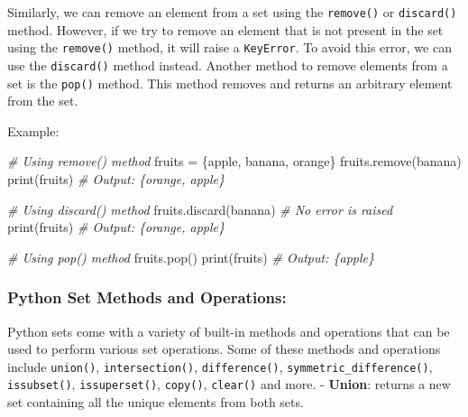 \documentclass[11pt]{article}
\newenvironment{Shaded}{}{}
\newcommand{\StringTok}[1]{\textcolor[rgb]{0.25,0.44,0.63}{{#1}}}
\newcommand{\CommentTok}[1]{\textcolor[rgb]{0.38,0.63,0.69}{\textit{{#1}}}}
\newcommand{\NormalTok}[1]{{#1}}
\newcommand{\OperatorTok}[1]{\textcolor[rgb]{0.40,0.40,0.40}{{#1}}}
\newcommand{\BuiltInTok}[1]{{#1}}
\begin{document}
Similarly, we can remove an element from a set using the
\texttt{remove()} or \texttt{discard()} method. However, if we try to
remove an element that is not present in the set using the
\texttt{remove()} method, it will raise a \texttt{KeyError}. To avoid
this error, we can use the \texttt{discard()} method instead. Another
method to remove elements from a set is the \texttt{pop()} method. This
method removes and returns an arbitrary element from the set.

Example:

\begin{Shaded}
\begin{Highlighting}[]
\CommentTok{\# Using remove() method}
\NormalTok{fruits }\OperatorTok{=}\NormalTok{ \{}\StringTok{\textquotesingle{}apple\textquotesingle{}}\NormalTok{, }\StringTok{\textquotesingle{}banana\textquotesingle{}}\NormalTok{, }\StringTok{\textquotesingle{}orange\textquotesingle{}}\NormalTok{\}}
\NormalTok{fruits.remove(}\StringTok{\textquotesingle{}banana\textquotesingle{}}\NormalTok{)}
\BuiltInTok{print}\NormalTok{(fruits) }\CommentTok{\# Output: \{\textquotesingle{}orange\textquotesingle{}, \textquotesingle{}apple\textquotesingle{}\}}

\CommentTok{\# Using discard() method}
\NormalTok{fruits.discard(}\StringTok{\textquotesingle{}banana\textquotesingle{}}\NormalTok{) }\CommentTok{\# No error is raised}
\BuiltInTok{print}\NormalTok{(fruits) }\CommentTok{\# Output: \{\textquotesingle{}orange\textquotesingle{}, \textquotesingle{}apple\textquotesingle{}\}}

\CommentTok{\# Using pop() method}
\NormalTok{fruits.pop()}
\BuiltInTok{print}\NormalTok{(fruits) }\CommentTok{\# Output: \{\textquotesingle{}apple\textquotesingle{}\}}
\end{Highlighting}
\end{Shaded}

\hypertarget{python-set-methods-and-operations}{%
\subsubsection{Python Set Methods and
Operations:}\label{python-set-methods-and-operations}}

Python sets come with a variety of built-in methods and operations that
can be used to perform various set operations. Some of these methods and
operations include \texttt{union()}, \texttt{intersection()},
\texttt{difference()}, \texttt{symmetric\_difference()},
\texttt{issubset()}, \texttt{issuperset()}, \texttt{copy()},
\texttt{clear()} and more. - \textbf{Union}: returns a new set
containing all the unique elements from both sets.
\end{document}
